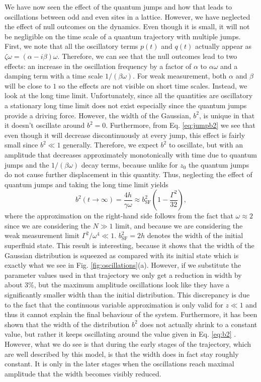 We have now seen the effect of the quantum jumps and how that leads to
oscillations between odd and even sites in a lattice. However, we have
neglected the effect of null outcomes on the dynamics. Even though it
is small, it will not be negligible on the time scale of a quantum
trajectory with multiple jumps. First, we note that all the
oscillatory terms $p(t)$ and $q(t)$ actually appear as
$\zeta \omega = (\alpha - i \beta) \omega$. Therefore, we can see that
the null outcomes lead to two effects: an increase in the oscillation
frequency by a factor of $\alpha$ to $\alpha \omega$ and a damping
term with a time scale $1/(\beta \omega)$. For weak measurement, both
$\alpha$ and $\beta$ will be close to $1$ so the effects are not
visible on short time scales. Instead, we look at the long time
limit. Unfortunately, since all the quantities are oscillatory a
stationary long time limit does not exist especially since the quantum
jumps provide a driving force. However, the width of the Gaussian,
$b^2$, is unique in that it doesn't oscillate around $b^2 =
0$. Furthermore, from Eq. \eqref{eq:jumpb2} we see that even though it
will decrease discontinuously at every jump, this effect is fairly
small since $b^2 \ll 1$ generally. Therefore, we expect $b^2$ to
oscillate, but with an amplitude that decreases approximately
monotonically with time due to quantum jumps and the
$1/(\beta \omega)$ decay terms, because unlike for $z_0$ the quantum
jumps do not cause further displacement in this quantity. Thus,
neglecting the effect of quantum jumps and taking the long time limit
yields
\begin{equation}
  \label{eq:b2}
  b^2(t \rightarrow \infty) = \frac{4 h} {\gamma \omega} \approx
  b^2_\mathrm{SF} \left( 1 - \frac{\Gamma^2}{32} \right),
\end{equation}
where the approximation on the right-hand side follows from the fact
that $\omega \approx 2$ since we are considering the $N \gg 1$ limit,
and because we are considering the weak measurement limit $\Gamma^2 /
\omega^4 \ll 1$. $b^2_\mathrm{SF} = 2h$ denotes the width of the
initial superfluid state. This result is interesting, because it shows
that the width of the Gaussian distribution is squeezed as compared
with its initial state which is exactly what we see in
Fig. \ref{fig:oscillations}(a). However, if we substitute the
parameter values used in that trajectory we only get a reduction in
width by about $3\%$, but the maximum amplitude oscillations look like
they have a significantly smaller width than the initial
distribution. This discrepancy is due to the fact that the continuous
variable approximation is only valid for $z \ll 1$ and thus it cannot
explain the final behaviour of the system. Furthermore, it has been
shown that the width of the distribution $b^2$ does not actually
shrink to a constant value, but rather it keeps oscillating around the
value given in Eq. \eqref{eq:b2} \cite{mazzucchi2016njp}. However,
what we do see is that during the early stages of the trajectory,
which are well described by this model, is that the width does in fact
stay roughly constant. It is only in the later stages when the
oscillations reach maximal amplitude that the width becomes visibly
reduced.

